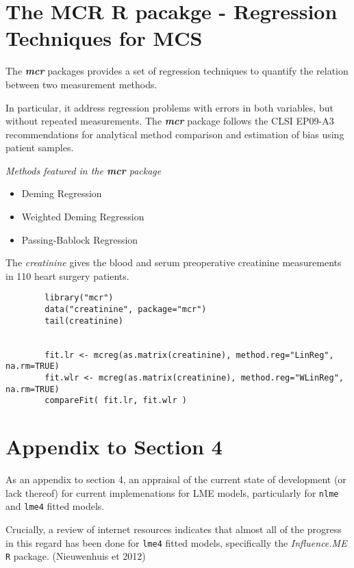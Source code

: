 	\section{The MCR R pacakge - Regression Techniques for MCS}
	
	The \textbf{\textit{mcr}} packages provides a set of regression techniques to quantify the relation between two measurement methods.
	
	In particular, it address regression problems with errors in both variables, but without repeated measurements.
	The \textbf{\textit{mcr}} package follows the CLSI EP09-A3 recommendations for analytical
	method comparison and estimation of bias using patient samples.
	
	
	\textit{Methods featured in the \textbf{mcr} package}
	
	\begin{itemize}
		\item Deming Regression
		\item Weighted Deming Regression
		\item Passing-Bablock Regression
	\end{itemize}
	
	The \textit{creatinine} gives the blood and serum preoperative creatinine measurements in 110 heart surgery patients.
	
	\begin{framed}
		\begin{verbatim}
		library("mcr")
		data("creatinine", package="mcr")
		tail(creatinine)
		
		
		fit.lr <- mcreg(as.matrix(creatinine), method.reg="LinReg", na.rm=TRUE)
		fit.wlr <- mcreg(as.matrix(creatinine), method.reg="WLinReg", na.rm=TRUE)
		compareFit( fit.lr, fit.wlr )
		\end{verbatim}
	\end{framed}
	
	

\section*{Appendix to Section 4}




As an appendix to section 4, an appraisal of the current state of development (or lack thereof) for current implemenations for LME models, particularly for
\texttt{nlme} and \texttt{lme4} fitted models.

Crucially, a review of internet resources indicates that almost all of the progress in this regard has been done for \texttt{lme4} fitted models, specifically the \textit{Influence.ME} \texttt{R} package. (Nieuwenhuis et 2012)

